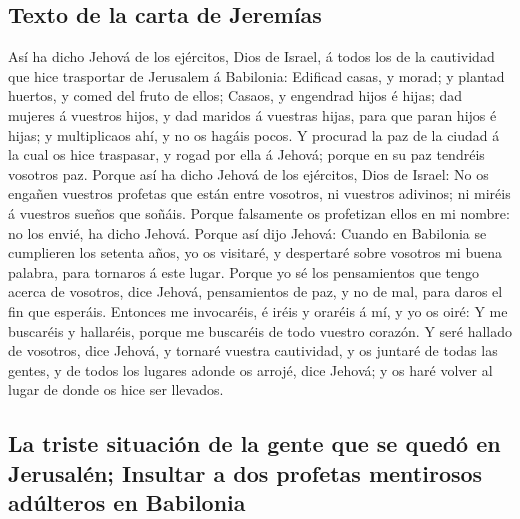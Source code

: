 \hypertarget{texto-de-la-carta-de-jeremuxedas}{%
\subsection{Texto de la carta de
Jeremías}\label{texto-de-la-carta-de-jeremuxedas}}

 Así ha dicho Jehová de los ejércitos, Dios de Israel, á
todos los de la cautividad que hice trasportar de Jerusalem á Babilonia:
 Edificad casas, y morad; y plantad huertos, y comed del
fruto de ellos;  Casaos, y engendrad hijos é hijas; dad
mujeres á vuestros hijos, y dad maridos á vuestras hijas, para que paran
hijos é hijas; y multiplicaos ahí, y no os hagáis pocos.  Y
procurad la paz de la ciudad á la cual os hice traspasar, y rogad por
ella á Jehová; porque en su paz tendréis vosotros paz. 
Porque así ha dicho Jehová de los ejércitos, Dios de Israel: No os
engañen vuestros profetas que están entre vosotros, ni vuestros
adivinos; ni miréis á vuestros sueños que soñáis.  Porque
falsamente os profetizan ellos en mi nombre: no los envié, ha dicho
Jehová.  Porque así dijo Jehová: Cuando en Babilonia se
cumplieren los setenta años, yo os visitaré, y despertaré sobre vosotros
mi buena palabra, para tornaros á este lugar.  Porque yo sé
los pensamientos que tengo acerca de vosotros, dice Jehová, pensamientos
de paz, y no de mal, para daros el fin que esperáis. 
Entonces me invocaréis, é iréis y oraréis á mí, y yo os oiré:
 Y me buscaréis y hallaréis, porque me buscaréis de todo
vuestro corazón.  Y seré hallado de vosotros, dice Jehová,
y tornaré vuestra cautividad, y os juntaré de todas las gentes, y de
todos los lugares adonde os arrojé, dice Jehová; y os haré volver al
lugar de donde os hice ser llevados.

\hypertarget{la-triste-situaciuxf3n-de-la-gente-que-se-queduxf3-en-jerusaluxe9n-insultar-a-dos-profetas-mentirosos-aduxfalteros-en-babilonia}{%
\subsection{La triste situación de la gente que se quedó en Jerusalén;
Insultar a dos profetas mentirosos adúlteros en
Babilonia}\label{la-triste-situaciuxf3n-de-la-gente-que-se-queduxf3-en-jerusaluxe9n-insultar-a-dos-profetas-mentirosos-aduxfalteros-en-babilonia}}


